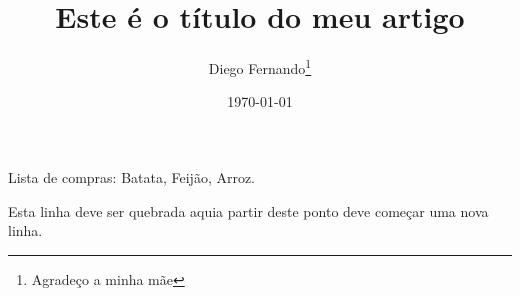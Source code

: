 \documentclass[12pt, a4paper]{article}
\title{Este é o título do meu artigo}
\author{Diego Fernando\thanks{Agradeço a minha mãe}}
\date{\today}
\begin{document}
\setlength{\parindent}{2cm}
\lipsum[1]
\noindent\lipsum[2]

\newpage
\lipsum[3]
\vspace{2cm}
Lista de compras: Batata, \hspace{1cm} Feijão, \hspace{1cm} Arroz.

Esta linha deve ser quebrada aqui\hfill\break a partir deste ponto deve começar uma nova linha.
\end{document}
